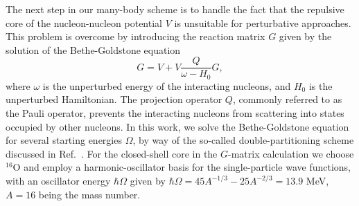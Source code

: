 \begin{multicols}{2}
The next step
in our many-body scheme is to handle
the fact that the repulsive core of the nucleon-nucleon potential $V$
is unsuitable for perturbative approaches. This problem is overcome
by introducing the reaction matrix $G$ given by the solution of the
Bethe-Goldstone equation
\begin{equation}
    G=V+V\frac{Q}{\omega - H_0}G,
\end{equation}
where $\omega$ is the unperturbed energy of the interacting nucleons,
and $H_0$ is the unperturbed Hamiltonian.
The projection operator $Q$, commonly referred to
as the Pauli operator, prevents the
interacting nucleons from scattering into states occupied by other nucleons.
In this work, we solve the Bethe-Goldstone equation for several
starting
energies $\Omega$, by way of the so-called double-partitioning scheme
discussed in  Ref.\ \cite{hko95}.
For the closed-shell core in the $G$-matrix calculation
we choose $^{16}$O and employ a harmonic-oscillator basis for the
single-particle
wave functions, with an oscillator energy $\hbar\Omega$ given
by
$\hbar\Omega = 45A^{-1/3} - 25A^{-2/3}=13.9 $ MeV,
$A=16$ being the mass
number.


\end{multicols}

